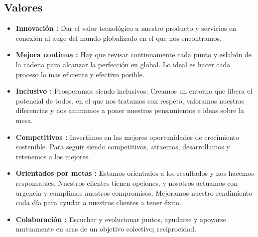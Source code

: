 \subsection{Valores}

\begin{itemize}
    \item \textbf{Innovación :} Dar el valor tecnológico a nuestro producto y servicios en conexión al auge del mundo globalizado en el que nos encontramos.
     \item \textbf {Mejora continua :} Hay que revisar continuamente cada punto y eslabón de la cadena para alcanzar la perfección en global. Lo ideal es hacer cada proceso lo mas eficiente y efectivo posible.
    \item \textbf {Inclusivo :} Prosperamos siendo inclusivos. Creamos un entorno que libera el potencial de todos, en el que nos tratamos con respeto, valoramos nuestras diferencias y nos animamos a poner nuestros pensamientos e ideas sobre la mesa.
    \item \textbf {Competitivos :} Invertimos en las mejores oportunidades de crecimiento sostenible. Para seguir siendo competitivos, atraemos, desarrollamos y retenemos a los mejores.
    \item \textbf {Orientados por metas :} Estamos orientados a los resultados y nos hacemos responsables. Nuestros clientes tienen opciones, y nosotros actuamos con urgencia y cumplimos nuestros compromisos. Mejoramos nuestro rendimiento cada día para ayudar a nuestros clientes a tener éxito.
    \item \textbf {Colaboración :} Escuchar y evolucionar juntos, ayudarse y apoyarse mutuamente en aras de un objetivo colectivo; reciprocidad.
\end{itemize}
